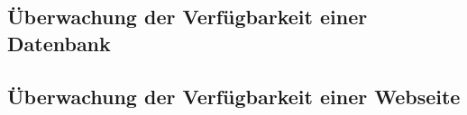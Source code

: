\documentclass[12pt,a4paper,parskip]{scrreprt}
\begin{document}
	\subsection{Überwachung der Verfügbarkeit einer Datenbank}
	\subsection{Überwachung der Verfügbarkeit einer Webseite}
	\begingroup
	\nocite{*} %
	\printbibliography 
	
	\endgroup
	\printglossary[title=Abkürzungsverzeichnis, type=\acronymtype] %
	\printglossary[title=Glossar]
\end{document}

